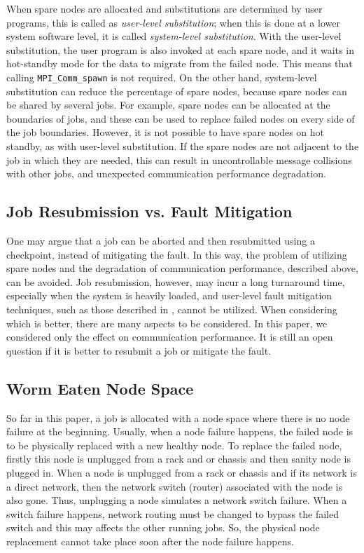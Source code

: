 \documentclass[Afour,times,sageh]{sagej}
\begin{document}
When spare nodes are
allocated and substitutions are determined by user programs, this is
called as {\it user-level substitution}; when this is done at a lower
system software level, it is called {\it system-level substitution}.
With the user-level substitution, the user program is also invoked at
each spare node, and it waits in hot-standby mode for the data to migrate
from the failed node. This means that calling {\tt MPI\_Comm\_spawn}
is not required. On the other hand, system-level substitution can
reduce the percentage of spare nodes, because spare nodes can be
shared by several jobs. For example, spare nodes can be allocated at
the boundaries of jobs, and these can be used to replace failed nodes
on every side of the job boundaries. However, it is not possible to have
spare nodes on hot standby, as with user-level substitution. If the
spare nodes are not adjacent to the job in which they are needed, this
can result in uncontrollable message collisions with other jobs, and
unexpected communication performance degradation.

\subsection{Job Resubmission vs. Fault Mitigation}

One may argue that a job can be aborted and then resubmitted using a
checkpoint, instead of mitigating the fault. In this way, the problem
of utilizing spare nodes and the degradation of communication
performance, described above, can be avoided. Job resubmission,
however, may incur a long turnaround time, especially when the system
is heavily loaded, and user-level fault mitigation techniques, such as
those described in \citep{Davies:2011:HPL:1995896.1995923}, cannot be
utilized. When considering which is better, there are many aspects to
be considered. In this paper, we considered only the effect on
communication performance. It is still an open question if it is
better to resubmit a job or mitigate the fault.

\subsection{Worm Eaten Node Space}

So far in this paper, a job is allocated with a node space where there
is no node failure at the beginning. Usually, when a node failure
happens, the failed node is to be physically replaced with a new healthy
node. To replace the failed node, firstly this node is unplugged from
a rack and or chassis and then sanity node is plugged in. When a node
is unplugged from a rack or chassis and if its network is a direct
network, then the network switch (router) associated with the node is
also gone. Thus, unplugging a node simulates a network switch
failure. When a switch failure happens, network routing must be
changed to bypass the failed switch and this may affects the other
running jobs. So, the physical node replacement cannot take place soon
after the node failure happens.
\end{document}
